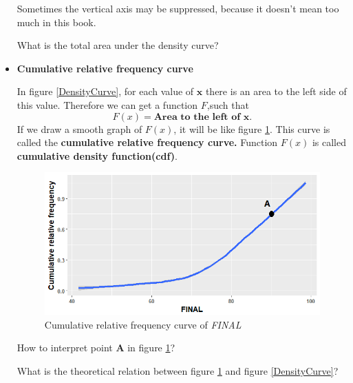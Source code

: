 \documentclass[a4paper, 12pt,twoside]{book}
\begin{document}
\begin{itemize}
\colorbox{babypink}{\parbox{15.2cm}{Sometimes the vertical axis may be suppressed, because it doesn't mean too much in this book.}}

\colorbox{dollarbill}{\parbox{15.2cm}{What is the total area under the density curve?}}
\vspace{1cm}
\item \textbf{Cumulative relative frequency curve}

In figure \ref{DensityCurve}, for each value of $\mathbf{x}$ there is an area to the left side of this value. Therefore we can get a function $F$,such that 
$$F(x) = \textbf{Area to the left of } \mathbf{x}.$$
If we draw a smooth graph of $F(x)$, it will be like figure \ref{CumulativeRFCurve}. This curve is called the \textbf{cumulative relative frequency curve.} Function $F(x)$ is called \textbf{cumulative density function(cdf)}.

\begin{figure}[H]
\centering
\includegraphics[scale=0.5]{CumulativeRFCurve.png}
\caption{Cumulative relative frequency curve of \textit{FINAL}}
\label{CumulativeRFCurve}
\end{figure}

\colorbox{dollarbill}{\parbox{15.2cm}{How to interpret point \textbf{A} in figure \ref{CumulativeRFCurve}?}}

\colorbox{dollarbill}{\parbox{15.2cm}{What is the theoretical relation between figure \ref{CumulativeRFCurve} and figure \ref{DensityCurve}?}}

\end{itemize}
\vspace{3cm}
\end{document}
